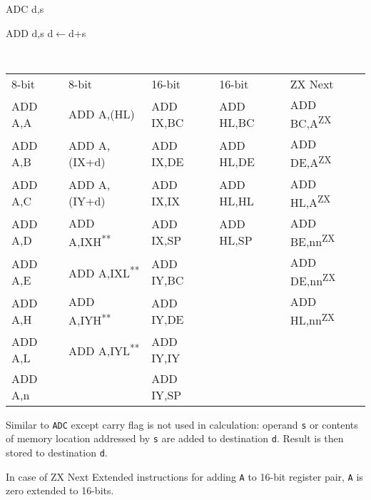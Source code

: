 \documentclass[12pt,twoside,openright,a4paper]{book}
\newcommand{\UNDOC}{\textnormal{\textsuperscript{**}}}
\newcommand{\ZXN}{\textnormal{\textsuperscript{ZX}}}
\begin{document}
\begin{basedescript}{
	\desclabelstyle{\multilinelabel}
	\desclabelwidth{3cm}}
\begin{detailitem}{ADC d,s}
		\begin{DetailEffects}[v]
		\end{DetailEffects}

		\begin{DetailTiming}
		\end{DetailTiming}
		
	\end{detailitem}

	\begin{detailitem}{ADD d,s}
		{d$\leftarrow$d+s}

		{
			\tt
			\begin{tabularx}{0.8\textwidth}{@{}p{1.7cm}Xp{2.15cm}p{2.15cm}p{2.4cm}}
				\textnormal{8-bit} & \textnormal{8-bit} & \textnormal{16-bit} & \textnormal{16-bit} & \textnormal{ZX Next} \\
				ADD A,A & 
					ADD A,(HL) & 
					ADD IX,BC & 
					ADD HL,BC & 
					ADD BC,A\ZXN \\
				ADD A,B & 
					ADD A,(IX+d) & 
					ADD IX,DE & 
					ADD HL,DE &
					ADD DE,A\ZXN \\
				ADD A,C & 
					ADD A,(IY+d) & 
					ADD IX,IX & 
					ADD HL,HL & 
					ADD HL,A\ZXN \\
				ADD A,D & 
					ADD A,IXH\UNDOC & 
					ADD IX,SP & 
					ADD HL,SP & 
					ADD BE,nn\ZXN \\ 
				ADD A,E & 
					ADD A,IXL\UNDOC & 
					ADD IY,BC & 
					& 
					ADD DE,nn\ZXN \\
				ADD A,H & 
					ADD A,IYH\UNDOC & 
					ADD IY,DE & 
					& 
					ADD HL,nn\ZXN \\
				ADD A,L & 
					ADD A,IYL\UNDOC & 
					ADD IY,IY \\
				ADD A,n &
					&
					ADD IY,SP \\
			\end{tabularx}
		}
		
		Similar to {\tt ADC} except carry flag is not used in calculation: operand {\tt s} or contents of memory location addressed by {\tt s} are added to destination {\tt d}. Result is then stored to destination {\tt d}.

		In case of ZX Next Extended instructions for adding {\tt A} to 16-bit register pair, {\tt A} is zero extended to 16-bits.


\end{detailitem}
\end{basedescript}
\end{document}
